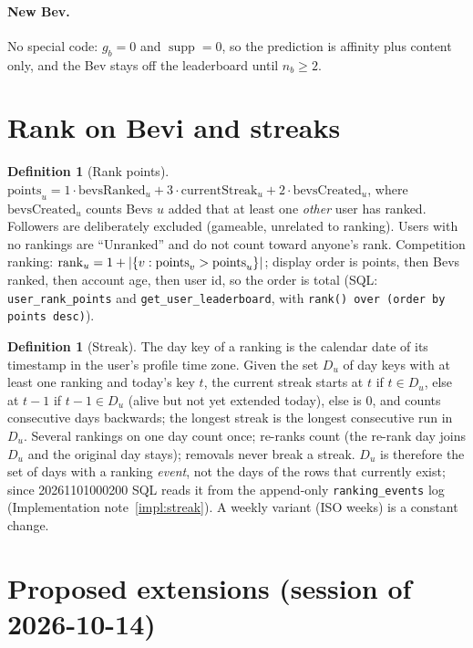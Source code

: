 \documentclass[11pt]{article}
\DeclarePairedDelimiter\abs{\lvert}{\rvert}
\DeclareMathOperator{\supp}{supp}
\newcommand{\code}[1]{\texttt{#1}}
\theoremstyle{plain}
\theoremstyle{definition}
\newtheorem{definition}[theorem]{Definition}
\theoremstyle{remark}
\begin{document}
\paragraph{New Bev.} No special code: $g_b = 0$ and $\supp = 0$, so the prediction is affinity plus content only, and the Bev stays off the leaderboard until $n_b \ge 2$.

\section{Rank on Bevi and streaks}\label{sec:rank}

\begin{definition}[Rank points]
$\mathrm{points}_u = 1\cdot \mathrm{bevsRanked}_u + 3\cdot \mathrm{currentStreak}_u + 2\cdot \mathrm{bevsCreated}_u$, where $\mathrm{bevsCreated}_u$ counts Bevs $u$ added that at least one \emph{other} user has ranked. Followers are deliberately excluded (gameable, unrelated to ranking). Users with no rankings are ``Unranked'' and do not count toward anyone's rank. Competition ranking: $\mathrm{rank}_u = 1 + \abs{\{v : \mathrm{points}_v > \mathrm{points}_u\}}$; display order is points, then Bevs ranked, then account age, then user id, so the order is total (SQL: \code{user\_rank\_points} and \code{get\_user\_leaderboard}, with \code{rank() over (order by points desc)}).
\end{definition}

\begin{definition}[Streak]
The day key of a ranking is the calendar date of its timestamp in the user's profile time zone. Given the set $D_u$ of day keys with at least one ranking and today's key $t$, the current streak starts at $t$ if $t \in D_u$, else at $t - 1$ if $t - 1 \in D_u$ (alive but not yet extended today), else is $0$, and counts consecutive days backwards; the longest streak is the longest consecutive run in $D_u$. Several rankings on one day count once; re-ranks count (the re-rank day joins $D_u$ and the original day stays); removals never break a streak. $D_u$ is therefore the set of days with a ranking \emph{event}, not the days of the rows that currently exist; since 20261101000200 SQL reads it from the append-only \code{ranking\_events} log (Implementation note~\ref{impl:streak}). A weekly variant (ISO weeks) is a constant change.
\end{definition}

\section{Proposed extensions (session of 2026-10-14)}\label{sec:extensions}
\end{document}
